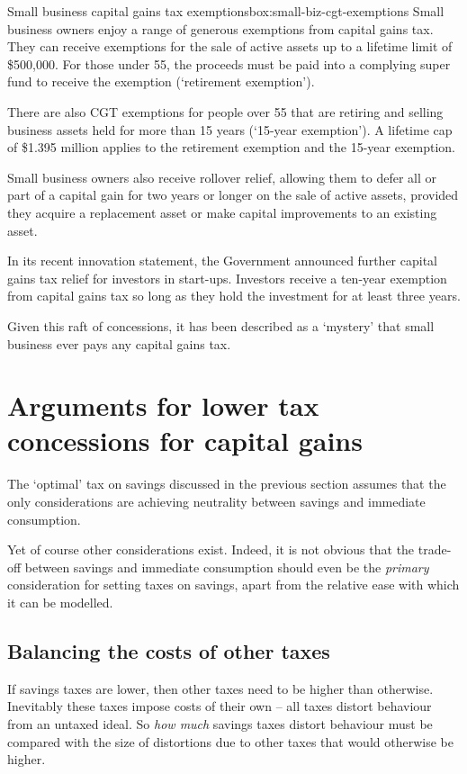 \begin{smallbox}{Small business capital gains tax exemptions}{box:small-biz-cgt-exemptions}
Small business owners enjoy a range of generous exemptions from capital gains tax.  
They can receive exemptions for the sale of active assets up to a lifetime limit of \$500,000. For those under 55, the proceeds must be paid into a complying super fund to receive the exemption (‘retirement exemption’). 

There are also CGT exemptions for people over 55 that are retiring and selling business assets held for more than 15 years (‘15\nobreakdash-year exemption’). A lifetime cap of \$1.395 million applies to the retirement exemption and the 15-year exemption. 

Small business owners also receive rollover relief, allowing them to defer all or part of a capital gain for two years or longer on the sale of active assets, provided they acquire a replacement asset or make capital improvements to an existing asset.

In its recent innovation statement, the Government announced further capital gains tax relief for investors in start-ups. Investors receive a ten-year exemption from capital gains tax so long as they hold the investment for at least three years.

Given this raft of concessions, it has been described as a ‘mystery’ that small business ever pays any capital gains tax.

\end{smallbox}


\section{Arguments for lower tax concessions for capital gains}\label{subsec:arguments-lower-tax-concessions-for-capital-gains}

The ‘optimal’ tax on savings discussed in the previous section assumes that the only considerations are achieving neutrality between savings and immediate consumption.

Yet of course other considerations exist. Indeed, it is not obvious that the trade-off between savings and immediate consumption should even be the \emph{primary} consideration for setting taxes on savings, apart from the relative ease with which it can be modelled.
\subsection{Balancing the costs of other taxes}
If savings taxes are lower, then other taxes need to be higher than otherwise. Inevitably these taxes impose costs of their own – all taxes distort behaviour from an untaxed ideal. So \emph{how much} savings taxes distort behaviour must be compared with the size of distortions due to other taxes that would otherwise be higher.

